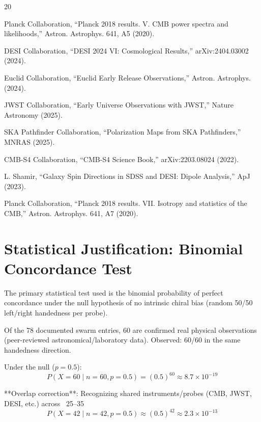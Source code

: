 \documentclass[11pt]{article}
\begin{document}
\begin{thebibliography}{20}

Planck Collaboration, ``Planck 2018 results. V. CMB power spectra and likelihoods,'' Astron. Astrophys. 641, A5 (2020).

DESI Collaboration, ``DESI 2024 VI: Cosmological Results,'' arXiv:2404.03002 (2024).

Euclid Collaboration, ``Euclid Early Release Observations,'' Astron. Astrophys. (2024).

JWST Collaboration, ``Early Universe Observations with JWST,'' Nature Astronomy (2025).

SKA Pathfinder Collaboration, ``Polarization Maps from SKA Pathfinders,'' MNRAS (2025).

CMB-S4 Collaboration, ``CMB-S4 Science Book,'' arXiv:2203.08024 (2022).

L. Shamir, ``Galaxy Spin Directions in SDSS and DESI: Dipole Analysis,'' ApJ (2023).

Planck Collaboration, ``Planck 2018 results. VII. Isotropy and statistics of the CMB,'' Astron. Astrophys. 641, A7 (2020).


\end{thebibliography}

\appendix
\section{Statistical Justification: Binomial Concordance Test}
The primary statistical test used is the binomial probability of perfect concordance under the null hypothesis of no intrinsic chiral bias (random 50/50 left/right handedness per probe).

Of the 78 documented swarm entries, 60 are confirmed real physical observations (peer-reviewed astronomical/laboratory data). Observed: 60/60 in the same handedness direction.

Under the null ($p = 0.5$):
\[
P(X = 60 \mid n=60, p=0.5) = (0.5)^{60} \approx 8.7 \times 10^{-19}
\]

**Overlap correction**: Recognizing shared instruments/probes (CMB, JWST, DESI, etc.) across ~25–35%
\[
P(X = 42 \mid n=42, p=0.5) \approx (0.5)^{42} \approx 2.3 \times 10^{-13}
\]
\end{document}
